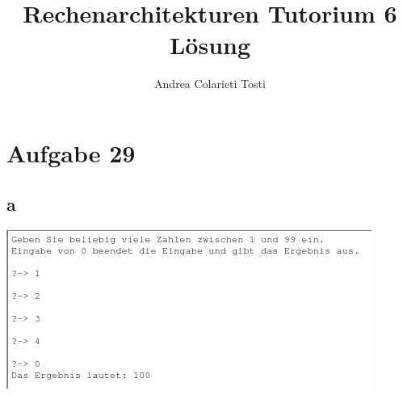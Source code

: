 \documentclass[10pt,a4paper]{article}
\author{Andrea Colarieti Tosti}
\title{Rechenarchitekturen Tutorium 6 Lösung}
\begin{document}
\maketitle \newpage

\section{Aufgabe 29}
\subsection{a}
\includegraphics[scale=0.9]{Ergebnis.png} 
\end{document}
